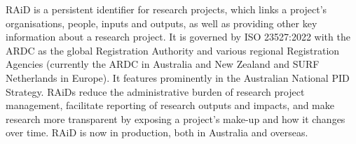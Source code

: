RAiD is a persistent identifier for research projects, which links a project’s organisations, people, inputs and outputs, as well as providing other key information about a research project. It is governed by ISO 23527:2022 with the ARDC as the global Registration Authority and various regional Registration Agencies (currently the ARDC in Australia and New Zealand and SURF Netherlands in Europe). It features prominently in the Australian National PID Strategy. RAiDs reduce the administrative burden of research project management, facilitate reporting of research outputs and impacts, and make research more transparent by exposing a project’s make-up and how it changes over time. RAiD is now in production, both in Australia and overseas. 